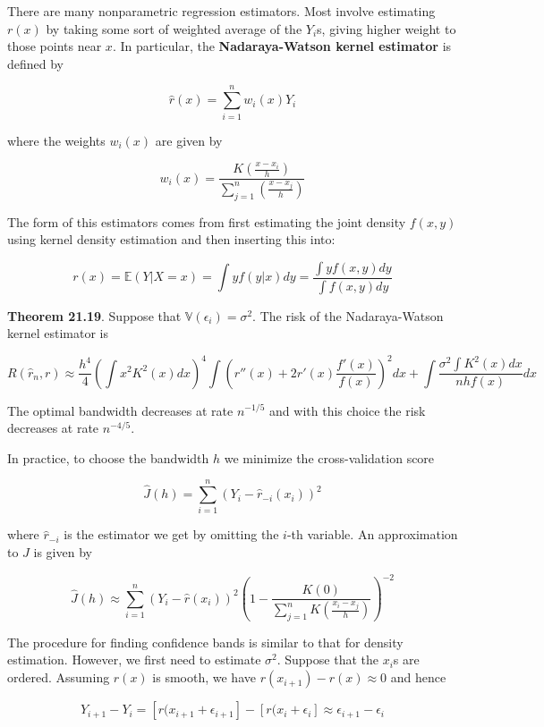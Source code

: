 There are many nonparametric regression estimators. Most involve
estimating \(r(x)\) by taking some sort of weighted average of the
\(Y_{i}\)s, giving higher weight to those points near \(x\). In
particular, the \textbf{Nadaraya-Watson kernel estimator} is defined by

\[ \hat{r}(x) = \sum_{i=1}^{n} w_{i}(x) Y_{i}\]

where the weights \(w_{i}(x)\) are given by

\[ w_{i}(x) = \frac{K\left(\frac{x - x_{i}}{h}\right)}{\sum_{j=1}^{n} \left(\frac{x - x_{j}}{h}\right) } \]

The form of this estimators comes from first estimating the joint
density \(f(x, y)\) using kernel density estimation and then inserting
this into:

\[ r(x) = \mathbb{E}(Y | X = x) = \int y f(y | x) dy = \frac{\int y f(x, y) dy}{\int f(x, y) dy} \]

\textbf{Theorem 21.19}. Suppose that
\(\mathbb{V}(\epsilon_{i}) = \sigma^{2}\). The risk of the Nadaraya-Watson
kernel estimator is

\[ R(\hat{r}_{n}, r) \approx \frac{h^{4}}{4} 
\left( \int x^{2} K^{2}(x) dx\right)^{4}
\int \left( r''(x) + 2 r'(x) \frac{f'(x)}{f(x)} \right)^{2} dx
+ \int \frac{\sigma^{2} \int K^{2}(x) dx}{nh f(x)} dx
\]

The optimal bandwidth decreases at rate \(n^{-1/5}\) and with this
choice the risk decreases at rate \(n^{-4/5}\).

In practice, to choose the bandwidth \(h\) we minimize the
cross-validation score

\[ \hat{J}(h) = \sum_{i=1}^{n} (Y_{i} - \hat{r}_{-i}(x_{i}))^{2}\]

where \(\hat{r}_{-i}\) is the estimator we get by omitting the \(i\)-th
variable. An approximation to \(\hat{J}\) is given by

\[ \hat{J}(h) \approx \sum_{i=1}^{n} (Y_{i} - \hat{r}(x_{i}))^{2} \left( 1 - \frac{K(0)}{\sum_{j=1}^{n} K \left( \frac{x_{i} - x_{j}}{h} \right)} \right)^{-2}\]

The procedure for finding confidence bands is similar to that for
density estimation. However, we first need to estimate \(\sigma^{2}\).
Suppose that the \(x_{i}\)s are ordered. Assuming \(r(x)\) is smooth, we
have \(r(x_{i+1}) - r(x) \approx 0\) and hence

\[Y_{i+1} - Y_{i} = \left[ r(x_{i+1} + \epsilon_{i+1} \right] - \left[ r(x_{i} + \epsilon_{i} \right] \approx \epsilon_{i+1} - \epsilon_{i} \]

